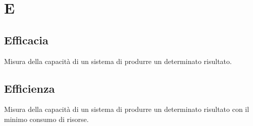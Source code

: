 \section{E}

    \subsection{Efficacia}
    \label{glossario:efficacia}
    Misura della capacità di un sistema di produrre un determinato risultato.

    \subsection{Efficienza}
    \label{glossario:efficienza}
    Misura della capacità di un sistema di produrre un determinato risultato con il minimo consumo di risorse.

\pagebreak